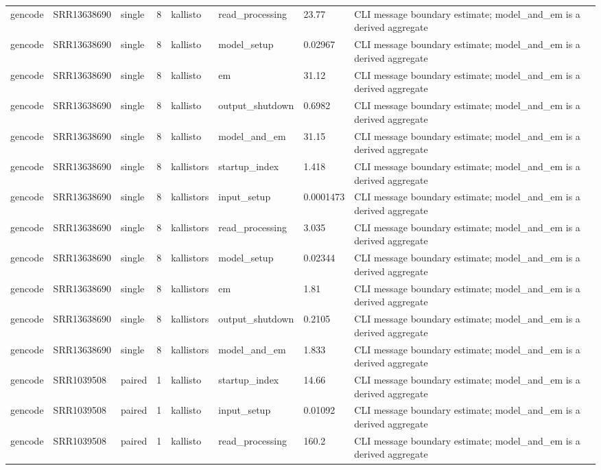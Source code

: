 \begin{tabular}{llllllll}
gencode & SRR13638690 & single & 8 & kallisto & read\_processing & 23.77 & CLI message boundary estimate; model\_and\_em is a derived aggregate \\
gencode & SRR13638690 & single & 8 & kallisto & model\_setup & 0.02967 & CLI message boundary estimate; model\_and\_em is a derived aggregate \\
gencode & SRR13638690 & single & 8 & kallisto & em & 31.12 & CLI message boundary estimate; model\_and\_em is a derived aggregate \\
gencode & SRR13638690 & single & 8 & kallisto & output\_shutdown & 0.6982 & CLI message boundary estimate; model\_and\_em is a derived aggregate \\
gencode & SRR13638690 & single & 8 & kallisto & model\_and\_em & 31.15 & CLI message boundary estimate; model\_and\_em is a derived aggregate \\
gencode & SRR13638690 & single & 8 & kallistors & startup\_index & 1.418 & CLI message boundary estimate; model\_and\_em is a derived aggregate \\
gencode & SRR13638690 & single & 8 & kallistors & input\_setup & 0.0001473 & CLI message boundary estimate; model\_and\_em is a derived aggregate \\
gencode & SRR13638690 & single & 8 & kallistors & read\_processing & 3.035 & CLI message boundary estimate; model\_and\_em is a derived aggregate \\
gencode & SRR13638690 & single & 8 & kallistors & model\_setup & 0.02344 & CLI message boundary estimate; model\_and\_em is a derived aggregate \\
gencode & SRR13638690 & single & 8 & kallistors & em & 1.81 & CLI message boundary estimate; model\_and\_em is a derived aggregate \\
gencode & SRR13638690 & single & 8 & kallistors & output\_shutdown & 0.2105 & CLI message boundary estimate; model\_and\_em is a derived aggregate \\
gencode & SRR13638690 & single & 8 & kallistors & model\_and\_em & 1.833 & CLI message boundary estimate; model\_and\_em is a derived aggregate \\
gencode & SRR1039508 & paired & 1 & kallisto & startup\_index & 14.66 & CLI message boundary estimate; model\_and\_em is a derived aggregate \\
gencode & SRR1039508 & paired & 1 & kallisto & input\_setup & 0.01092 & CLI message boundary estimate; model\_and\_em is a derived aggregate \\
gencode & SRR1039508 & paired & 1 & kallisto & read\_processing & 160.2 & CLI message boundary estimate; model\_and\_em is a derived aggregate \\

\end{tabular}
